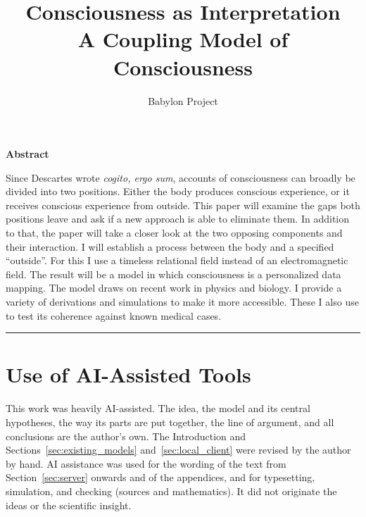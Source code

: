 \documentclass[12pt,a4paper]{article}
\title{\textbf{Consciousness as Interpretation}\\
\large A Coupling Model of Consciousness}
\author{Babylon Project}
\date{}
\begin{document}
\maketitle
\thispagestyle{empty}

\begin{center}
\textbf{Abstract}
\end{center}
\noindent
Since Descartes wrote \emph{cogito, ergo sum}, accounts of consciousness can
broadly be divided into two positions. Either the body produces conscious
experience, or it receives conscious experience from outside. This paper will
examine the gaps both positions leave and ask if a new approach is able to
eliminate them. In addition to that, the paper will take a closer look at the
two opposing components and their interaction. I will establish a process
between the body and a specified ``outside''. For this I use a timeless relational field instead of
an electromagnetic field. The result will be a model in
which consciousness is a personalized data mapping. The model draws on recent
work in physics and biology. I provide a variety of derivations and simulations to make it more accessible.
These I also use to test its coherence against known medical cases.

\bigskip
\noindent\rule{\linewidth}{0.4pt}
\bigskip

\newpage



\appendix


\section*{Use of AI-Assisted Tools}
\noindent This work was heavily AI-assisted. The idea, the model and its central
hypotheses, the way its parts are put together, the line of argument, and all
conclusions are the author's own. The Introduction and
Sections~\ref{sec:existing_models} and~\ref{sec:local_client} were revised by the
author by hand. AI assistance was used for the wording of the text from
Section~\ref{sec:server} onwards and of the appendices, and for typesetting,
simulation, and checking (sources and mathematics). It did not originate the ideas or
the scientific insight.


\begingroup
\small
\singlespacing
\sloppy
\setlength{\emergencystretch}{4em}
\setlength{\bibsep}{3pt plus 0.5pt minus 0.5pt}
\setlength{\bibhang}{1.25em}

\endgroup
\end{document}

